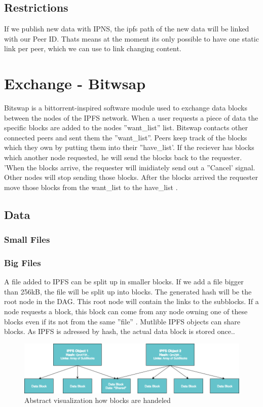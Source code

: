 \documentclass[a4paper,11pt, oneside]{report}
\theoremstyle{definition}
\begin{document}
\subsection{Restrictions}
If we publish new data with IPNS, the ipfs path of the new data will be linked with our Peer ID. Thats means at the moment its only possible to have one static link per peer, which we can use to link changing content.



\newpage

\section{Exchange - Bitwsap}
Bitswap is a bittorrent-inspired software module used to exchange data blocks between the nodes of the IPFS network. When a user requests a piece of data the specific blocks are added to the nodes ''want\_list'' list. Bitswap contacts other connected peers and sent them the ''want\_list''. Peers keep track of the blocks which they own by putting them into their ''have\_list'. If the reciever has blocks which another node requested, he will send the blocks back to the requester. 'When the blocks arrive, the requester will imidiately send out a ''Cancel' signal. Other nodes will stop sending those blocks. After the blocks arrived the requester move those blocks from the want\_list to the have\_list  \cite{bitswap}.
\subsection{Data}
\subsubsection{Small Files}
\subsubsection{Big Files}
A file added to IPFS can be split up in smaller blocks. If we add a file bigger than 256kB, the file will be split up into blocks. The generated hash will be the root node in the DAG. This root node will contain the links to the subblocks. If a node requests a block, this block can come from any node owning one of these blocks even if its not from the same ''file'' \cite{fileblock}. Mutlible IPFS objects can share blocks. As IPFS is adressed by hash, the actual data block is stored once.\cite{fileblock2}. \\[0.3cm]
\begin{figure}[H]
\centering
\includegraphics[width=\textwidth]{img/ipfs-fileblocks.png}
\caption[Objects \& Blocks]{Abstract visualization how blocks are handeled}
\end{figure}
\end{document}
